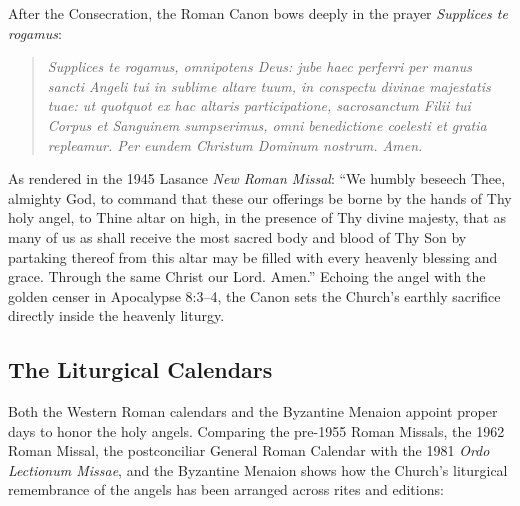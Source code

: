 After the Consecration, the Roman Canon bows deeply in the prayer \emph{Supplices te rogamus}:

\begin{quotation}
\emph{Supplices te rogamus, omnipotens Deus: jube haec perferri per manus sancti Angeli tui in sublime altare tuum, in conspectu divinae majestatis tuae: ut quotquot ex hac altaris participatione, sacrosanctum Filii tui Corpus et Sanguinem sumpserimus, omni benedictione coelesti et gratia repleamur. Per eundem Christum Dominum nostrum. Amen.}
\end{quotation}

As rendered in the 1945 Lasance \emph{New Roman Missal}: ``We humbly beseech Thee, almighty God, to command that these our offerings be borne by the hands of Thy holy angel, to Thine altar on high, in the presence of Thy divine majesty, that as many of us as shall receive the most sacred body and blood of Thy Son by partaking thereof from this altar may be filled with every heavenly blessing and grace. Through the same Christ our Lord. Amen.'' Echoing the angel with the golden censer in Apocalypse 8:3--4, the Canon sets the Church's earthly sacrifice directly inside the heavenly liturgy.

\subsection{The Liturgical Calendars}

Both the Western Roman calendars and the Byzantine Menaion appoint proper days to honor the holy angels. Comparing the pre-1955 Roman Missals, the 1962 Roman Missal, the postconciliar General Roman Calendar with the 1981 \emph{Ordo Lectionum Missae}, and the Byzantine Menaion shows how the Church's liturgical remembrance of the angels has been arranged across rites and editions:

